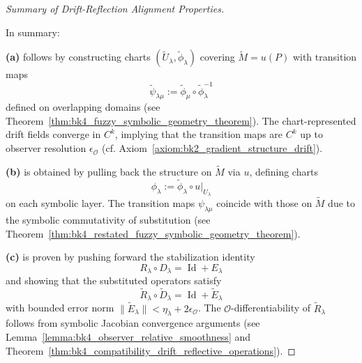 \begin{proof}[Summary of Drift-Reflection Alignment Properties]

\label{proof:bk4_drift_reflection_summary}

In summary:

\textbf{(a)} follows by constructing charts \( (\tilde{U}_\lambda, \tilde{\phi}_\lambda) \) covering \( \tilde{M} = u(P) \) with transition maps 
\[
\tilde{\psi}_{\lambda\mu} := \tilde{\phi}_\mu \circ \tilde{\phi}_\lambda^{-1}
\]
defined on overlapping domains (see Theorem~\ref{thm:bk4_fuzzy_symbolic_geometry_theorem}). The chart-represented drift fields converge in \( C^k \), implying that the transition maps are \( C^k \) up to observer resolution \( \epsilon_\mathcal{O} \) (cf. Axiom~\ref{axiom:bk2_gradient_structure_drift}).

\textbf{(b)} is obtained by pulling back the structure on \( \tilde{M} \) via \( u \), defining charts 
\[
\phi_\lambda := \tilde{\phi}_\lambda \circ u|_{U_\lambda}
\]
on each symbolic layer. The transition maps \( \psi_{\lambda\mu} \) coincide with those on \( \tilde{M} \) due to the symbolic commutativity of substitution (see Theorem~\ref{thm:bk4_restated_fuzzy_symbolic_geometry_theorem}).

\textbf{(c)} is proven by pushing forward the stabilization identity 
\[
R_\lambda \circ D_\lambda = \operatorname{Id} + E_\lambda
\]
and showing that the substituted operators satisfy
\[
\tilde{R}_\lambda \circ \tilde{D}_\lambda = \operatorname{Id} + \tilde{E}_\lambda
\]
with bounded error norm \( \|\tilde{E}_\lambda\| < \eta_\lambda + 2\epsilon_\mathcal{O} \). The \( \mathcal{O} \)-differentiability of \( \tilde{R}_\lambda \) follows from symbolic Jacobian convergence arguments (see Lemma~\ref{lemma:bk4_observer_relative_smoothness} and Theorem~\ref{thm:bk4_compatibility_drift_reflective_operations}).

\end{proof}

